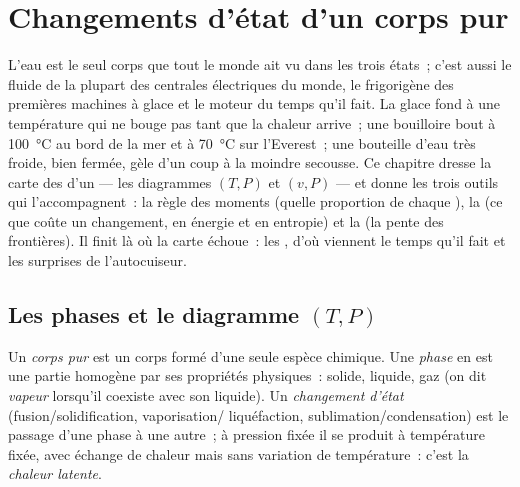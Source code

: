 \chapter{Changements d'état d'un corps pur}\label{ch:b1:phase-changes}

L'eau est le seul corps que tout le monde ait vu dans les trois états~;
c'est aussi le fluide de la plupart des centrales électriques du monde, le
frigorigène des premières machines à glace et le moteur du temps qu'il fait.
La glace fond à une température qui ne bouge pas tant que la chaleur
arrive~; une bouilloire bout à \qty{100}{\degreeCelsius} au bord de la mer et
à \qty{70}{\degreeCelsius} sur l'Everest~; une bouteille d'eau très froide,
bien fermée, gèle d'un coup à la moindre secousse. Ce chapitre dresse la
carte des  d'un  --- les diagrammes $(T, P)$ et $(v, P)$ ---
et donne les trois outils qui l'accompagnent~: la règle des moments (quelle
proportion de chaque ), la  (ce que coûte un changement,
en énergie et en entropie) et la  (la pente
des frontières). Il finit là où la carte échoue~: les , d'où
viennent le temps qu'il fait et les surprises de l'autocuiseur.

\section{Les phases et le diagramme $(T, P)$}

\begin{definition}\label{def:b1:phase-changes:phase}
Un \emph{corps pur} est un corps formé d'une seule espèce chimique. Une
\emph{phase} en est une partie homogène par ses propriétés physiques~:
solide, liquide, gaz (on dit \emph{vapeur} lorsqu'il coexiste avec son
liquide). Un \emph{changement d'état} (fusion/solidification, vaporisation/
liquéfaction, sublimation/condensation) est le passage d'une phase à une
autre~; à pression fixée il se produit à température fixée, avec échange de
chaleur mais sans variation de température~: c'est la \emph{chaleur latente}.
\end{definition}

